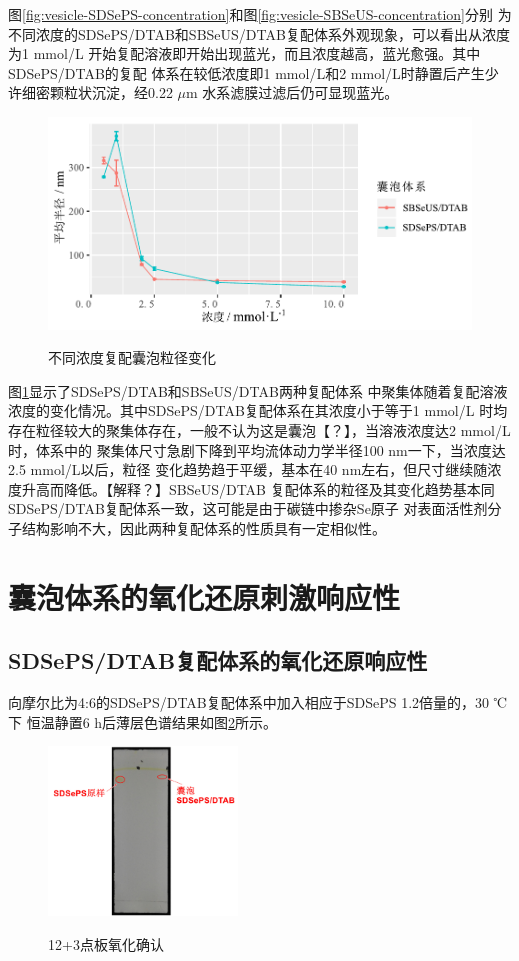 \documentclass[bachelor,fandolfonts,replaceperiod]{jnuthesis}
\begin{document}
    图\ref{fig:vesicle-SDSePS-concentration}和图\ref{fig:vesicle-SBSeUS-concentration}分别
    为不同浓度的SDSePS/DTAB和SBSeUS/DTAB复配体系外观现象，可以看出从浓度为1 mmol/L
    开始复配溶液即开始出现蓝光，而且浓度越高，蓝光愈强。其中SDSePS/DTAB的复配
    体系在较低浓度即1 mmol/L和2 mmol/L时静置后产生少许细密颗粒状沉淀，经0.22 $\mu$m
    水系滤膜过滤后仍可显现蓝光。
    
    \begin{figure}[htbp]
        \centering
        \includegraphics[width=.825\textwidth]{Figure/vesicle-concentration-line.pdf}\\
        \caption{不同浓度复配囊泡粒径变化}\label{fig:vesicle-concentration-line}
    \end{figure}
    
    图\ref{fig:vesicle-concentration-line}显示了SDSePS/DTAB和SBSeUS/DTAB两种复配体系
    中聚集体随着复配溶液浓度的变化情况。其中SDSePS/DTAB复配体系在其浓度小于等于1 mmol/L
    时均存在粒径较大的聚集体存在，一般不认为这是囊泡【？】，当溶液浓度达2 mmol/L时，体系中的
    聚集体尺寸急剧下降到平均流体动力学半径100 nm一下，当浓度达2.5 mmol/L以后，粒径
    变化趋势趋于平缓，基本在40 nm左右，但尺寸继续随浓度升高而降低。【解释？】SBSeUS/DTAB
    复配体系的粒径及其变化趋势基本同SDSePS/DTAB复配体系一致，这可能是由于碳链中掺杂Se原子
    对表面活性剂分子结构影响不大，因此两种复配体系的性质具有一定相似性。
        
    \section{囊泡体系的氧化还原刺激响应性}
    \subsection{SDSePS/DTAB复配体系的氧化还原响应性}
    向摩尔比为4:6的SDSePS/DTAB复配体系中加入相应于SDSePS 1.2倍量的，30 ℃下
    恒温静置6 h后薄层色谱结果如图\ref{fig:SDSePS-Ox-tlc}所示。
    \begin{figure}[htbp]
        \centering
        \includegraphics[height=4.5cm]{figure/SDSePS-Ox-tlc.jpg}\\
        \caption{12+3点板氧化确认}\label{fig:SDSePS-Ox-tlc}
    \end{figure}
    
\end{document}

